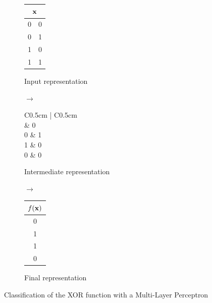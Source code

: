 \begin{figure}[ht]
  \centering
  \begin{subfigure}[t]{0.30\textwidth}
    \centering
    \begin{tabular}{c|c}
      \multicolumn{2}{c}{$\mathbf{x}$} \\
      \midrule
      0 & 0 \\
      0 & 1 \\
      1 & 0 \\
      1 & 1
    \end{tabular} 
    \caption*{Input representation}
  \end{subfigure}
  \begin{subfigure}[t]{0.03\textwidth}
    $\rightarrow$
  \end{subfigure}
  \begin{subfigure}[t]{0.30\textwidth}
    \centering
    \begin{tabular}{C{0.5cm} | C{0.5cm}}
       \\
       & 0 \\
      0 & 1 \\
      1 & 0 \\
      0 & 0
    \end{tabular}
    \caption*{Intermediate representation}
  \end{subfigure}
  \begin{subfigure}[t]{0.03\textwidth}
    $\rightarrow$
  \end{subfigure}
  \begin{subfigure}[t]{0.30\textwidth}
    \centering
    \begin{tabular}{c}
      $f(\mathbf{x})$ \\
      \midrule
      0 \\
      1 \\
      1 \\
      0
    \end{tabular}
    \caption*{Final representation}
  \end{subfigure}
  \caption{Classification of the XOR function with a Multi-Layer Perceptron}
  \label{figure:multi_layer_perceptron}
\end{figure}


